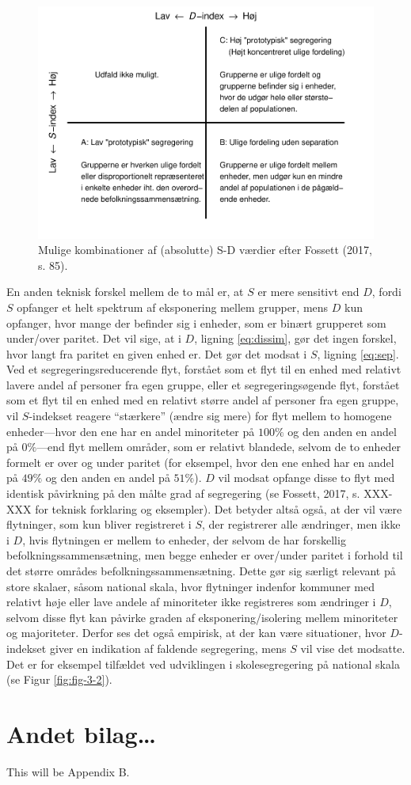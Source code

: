 \documentclass[
]{book}
\begin{document}
\begin{figure}
\includegraphics[width=1\linewidth]{en-befolkning-blander-sig_files/figure-latex/fig-9-4-1} \caption{Mulige kombinationer af (absolutte) S-D værdier efter Fossett (2017, s. 85).}\label{fig:fig-9-4}
\end{figure}

En anden teknisk forskel mellem de to mål er, at \(S\) er mere sensitivt end \(D\), fordi \(S\) opfanger et helt spektrum af eksponering mellem grupper, mens \(D\) kun opfanger, hvor mange der befinder sig i enheder, som er binært grupperet som under/over paritet. Det vil sige, at i \(D\), ligning \eqref{eq:dissim}, gør det ingen forskel, hvor langt fra paritet en given enhed er. Det gør det modsat i \(S\), ligning \eqref{eq:sep}. Ved et segregeringsreducerende flyt, forstået som et flyt til en enhed med relativt lavere andel af personer fra egen gruppe, eller et segregeringsøgende flyt, forstået som et flyt til en enhed med en relativt større andel af personer fra egen gruppe, vil \(S\)-indekset reagere ``stærkere'' (ændre sig mere) for flyt mellem to homogene enheder---hvor den ene har en andel minoriteter på \(100\%\) og den anden en andel på \(0\%\)---end flyt mellem områder, som er relativt blandede, selvom de to enheder formelt er over og under paritet (for eksempel, hvor den ene enhed har en andel på \(49\%\) og den anden en andel på \(51\%\)). \(D\) vil modsat opfange disse to flyt med identisk påvirkning på den målte grad af segregering (se Fossett, 2017, s. XXX-XXX for teknisk forklaring og eksempler). Det betyder altså også, at der vil være flytninger, som kun bliver registreret i \(S\), der registrerer alle ændringer, men ikke i \(D\), hvis flytningen er mellem to enheder, der selvom de har forskellig befolkningssammensætning, men begge enheder er over/under paritet i forhold til det større områdes befolkningssammensætning. Dette gør sig særligt relevant på store skalaer, såsom national skala, hvor flytninger indenfor kommuner med relativt høje eller lave andele af minoriteter ikke registreres som ændringer i \(D\), selvom disse flyt kan påvirke graden af eksponering/isolering mellem minoriteter og majoriteter. Derfor ses det også empirisk, at der kan være situationer, hvor \(D\)-indekset giver en indikation af faldende segregering, mens \(S\) vil vise det modsatte. Det er for eksempel tilfældet ved udviklingen i skolesegregering på national skala (se Figur \ref{fig:fig-3-2}).

\chapter{Andet bilag\ldots{}}\label{bilag2}

This will be Appendix B.
\end{document}
